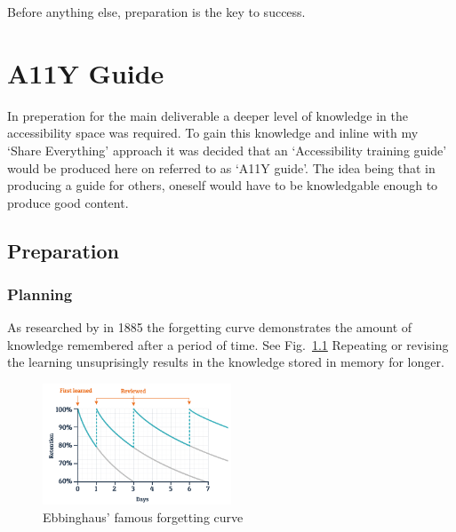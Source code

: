 \begin{savequote}[75mm]
Before anything else, preparation is the key to success.
\end{savequote}

\chapter{A11Y Guide}
In preperation for the main deliverable a deeper level of knowledge in the
accessibility space was required. To gain this knowledge and inline with my
`Share Everything' approach it was decided that an `Accessibility
training guide' would be produced here on referred to as `A11Y guide'. The idea
being that in producing a guide for others, oneself would have to be
knowledgable enough to produce good content.

\section{Preparation}
\subsection{Planning}

As researched by \citep{Ebbinghaus} in 1885 the forgetting curve demonstrates the
amount of knowledge remembered after a period of time. See Fig.~\ref{fig:ebbinghaus}
Repeating or revising the learning unsuprisingly results in the knowledge
stored in memory for longer.

\begin{figure}[H]
\centering
\includegraphics[width=0.5\textwidth]{figures/ebbinghaus}
\captionsetup{justification=centering}
\caption{Ebbinghaus' famous forgetting curve
\label{fig:ebbinghaus}}
\end{figure}

